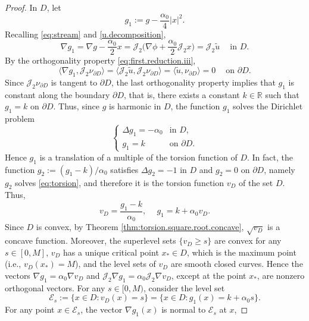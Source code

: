 \documentclass[10pt,reqno,a4paper]{article}
\numberwithin{equation}{section}
\theoremstyle{plain}
\theoremstyle{definition}
\newcommand{\R}{{\mathbb R}}
\newcommand{\mE}{\mathcal{E}}
\newcommand{\mJ}{\mathcal{J}}
\newcommand{\la}{\langle}
\newcommand{\ra}{\rangle}
\newcommand{\pa}{\partial}
\newcommand{\grad}{\nabla}
\begin{document}
\begin{proof}
In $D$, let 
\begin{equation}\label{g1.def}
g_1 := g - \frac{\alpha_0}{4} |x|^2.
\end{equation}
Recalling \eqref{eq:stream} and \eqref{u.decomposition}, 
\begin{equation} \label{grad.g1.J2.tilde.u}
\nabla g_1 
= \nabla g -\frac{\alpha_0}{2} x
= \mJ_2 \big( \nabla \phi +\frac{\alpha_0}{2} \mJ_2 x \big)
= \mJ_2 \tilde u 
\quad \ \text{in } D.
\end{equation}
By the orthogonality property \eqref{eq:first.reduction.iii}, 
\[
\la \nabla g_1, \mJ_2 \nu_{\pa D} \ra 
= \la \mJ_2 \tilde u, \mJ_2 \nu_{\pa D} \ra
= \la \tilde u , \nu_{\pa D} \ra 
= 0 
\quad \ \text{on } \pa D.
\]
Since $\mJ_2 \nu_{\pa D}$ is tangent to $\pa D$, the last orthogonality property 
implies that $g_1$ is constant along the boundary $\pa D$, 
that is, there exists a constant $k \in \R$ such that $g_1=k$ on $\pa D$.
Thus, since $g$ is harmonic in $D$, the function $g_1$ solves the Dirichlet problem
\[
\begin{cases}
\Delta g_1 = - \alpha_0 & \text{in } D, \\
g_1 = k & \text{on } \pa D.
\end{cases}
\]
Hence $g_1$ is a translation of a multiple of the torsion function of $D$. 
In fact, the function $g_2 := (g_1 - k)/\alpha_0$ satisfies 
$\Delta g_2 = -1$ in $D$ and $g_2 = 0$ on $\pa D$, 
namely $g_2$ solves \eqref{eq:torsion}, 
and therefore it is the torsion function $v_D$ of the set $D$. 
Thus,  
\begin{equation} \label{g.1.v.D}
v_D = \frac{g_1-k }{\alpha_0}, \quad \ 
g_1 = k + \alpha_0 v_D.
\end{equation}
Since $D$ is convex, by Theorem \ref{thm:torsion.square.root.concave}, $\sqrt {v_D}$ is a concave function. 
Moreover, the superlevel sets $\{v_D\geq s\}$ are convex for any $s\in [0, M]$, 
$v_D$ has a unique critical point $x_* \in D$, which is the maximum point 
(i.e., $v_D(x_*) = M$), and the level sets of $v_D$ are smooth closed curves.  
Hence the vectors $\grad g_1 = \alpha_0 \grad v_D$ and $\mJ_2 \grad g_1 = \alpha_0 \mJ_2 \grad v_D$, 
except at the point $x_*$, are nonzero orthogonal vectors.
For any $s \in [0,M)$, consider the level set
\begin{equation} \label{def.mE.s}
\mE_s := \{ x \in D : v_D(x) = s \}
= \{ x \in D : g_1(x) = k + \alpha_0 s \}.
\end{equation}
For any point $x \in \mE_s$, 
the vector $\grad g_1(x)$ is normal to $\mE_s$ at $x$, 

\end{proof}
\end{document}
